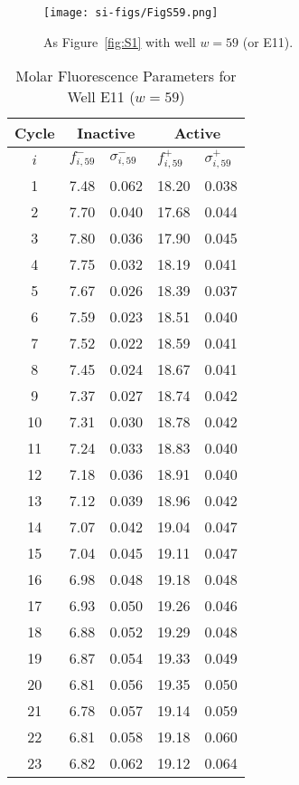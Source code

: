                 \begin{figure}
                    \centering
                    \texttt{[image: si-figs/FigS59.png]}
                    \caption{
                        As Figure~\ref{fig:S1} with well $w=59$ (or E11).
                    }
                \end{figure}
                \clearpage
    \begin{table}
        \caption{Molar Fluorescence Parameters for Well E11 ($w=59$)}
        \centering
        \begin{tabular}{c|ll|ll}
            Cycle & \multicolumn{2}{c|}{Inactive} & \multicolumn{2}{c}{Active} \\
            \hline
            $i$ & $f_{i,59}^{-}$ & $\sigma_{i,59}^{-}$ &  $f_{i,59}^{+}$ & $\sigma_{i,59}^{+}$ \\
            \hline
    1 & 7.48 & 0.062 & 18.20 & 0.038 \\
2 & 7.70 & 0.040 & 17.68 & 0.044 \\
3 & 7.80 & 0.036 & 17.90 & 0.045 \\
4 & 7.75 & 0.032 & 18.19 & 0.041 \\
5 & 7.67 & 0.026 & 18.39 & 0.037 \\
6 & 7.59 & 0.023 & 18.51 & 0.040 \\
7 & 7.52 & 0.022 & 18.59 & 0.041 \\
8 & 7.45 & 0.024 & 18.67 & 0.041 \\
9 & 7.37 & 0.027 & 18.74 & 0.042 \\
10 & 7.31 & 0.030 & 18.78 & 0.042 \\
11 & 7.24 & 0.033 & 18.83 & 0.040 \\
12 & 7.18 & 0.036 & 18.91 & 0.040 \\
13 & 7.12 & 0.039 & 18.96 & 0.042 \\
14 & 7.07 & 0.042 & 19.04 & 0.047 \\
15 & 7.04 & 0.045 & 19.11 & 0.047 \\
16 & 6.98 & 0.048 & 19.18 & 0.048 \\
17 & 6.93 & 0.050 & 19.26 & 0.046 \\
18 & 6.88 & 0.052 & 19.29 & 0.048 \\
19 & 6.87 & 0.054 & 19.33 & 0.049 \\
20 & 6.81 & 0.056 & 19.35 & 0.050 \\
21 & 6.78 & 0.057 & 19.14 & 0.059 \\
22 & 6.81 & 0.058 & 19.18 & 0.060 \\
23 & 6.82 & 0.062 & 19.12 & 0.064 \\

\end{tabular}
\end{table}
